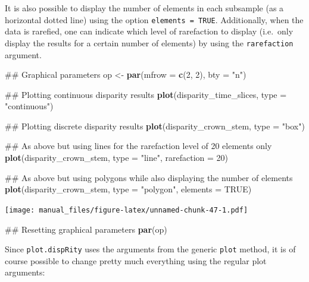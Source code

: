 \documentclass[]{book}
\newenvironment{Shaded}{\begin{snugshade}}{\end{snugshade}}
\newcommand{\KeywordTok}[1]{\textcolor[rgb]{0.13,0.29,0.53}{\textbf{#1}}}
\newcommand{\DataTypeTok}[1]{\textcolor[rgb]{0.13,0.29,0.53}{#1}}
\newcommand{\DecValTok}[1]{\textcolor[rgb]{0.00,0.00,0.81}{#1}}
\newcommand{\StringTok}[1]{\textcolor[rgb]{0.31,0.60,0.02}{#1}}
\newcommand{\OtherTok}[1]{\textcolor[rgb]{0.56,0.35,0.01}{#1}}
\newcommand{\NormalTok}[1]{#1}
\theoremstyle{definition}
\theoremstyle{definition}
\theoremstyle{remark}
\begin{document}
It is also possible to display the number of elements in each subsample
(as a horizontal dotted line) using the option
\texttt{elements\ =\ TRUE}. Additionally, when the data is rarefied, one
can indicate which level of rarefaction to display (i.e.~only display
the results for a certain number of elements) by using the
\texttt{rarefaction} argument.

\begin{Shaded}
\begin{Highlighting}[]
\NormalTok{## Graphical parameters}
\NormalTok{op <-}\StringTok{ }\KeywordTok{par}\NormalTok{(}\DataTypeTok{mfrow =} \KeywordTok{c}\NormalTok{(}\DecValTok{2}\NormalTok{, }\DecValTok{2}\NormalTok{), }\DataTypeTok{bty =} \StringTok{"n"}\NormalTok{)}

\NormalTok{## Plotting continuous disparity results}
\KeywordTok{plot}\NormalTok{(disparity_time_slices, }\DataTypeTok{type =} \StringTok{"continuous"}\NormalTok{)}

\NormalTok{## Plotting discrete disparity results}
\KeywordTok{plot}\NormalTok{(disparity_crown_stem, }\DataTypeTok{type =} \StringTok{"box"}\NormalTok{)}

\NormalTok{## As above but using lines for the rarefaction level of 20 elements only}
\KeywordTok{plot}\NormalTok{(disparity_crown_stem, }\DataTypeTok{type =} \StringTok{"line"}\NormalTok{, }\DataTypeTok{rarefaction =} \DecValTok{20}\NormalTok{)}

\NormalTok{## As above but using polygons while also displaying the number of elements}
\KeywordTok{plot}\NormalTok{(disparity_crown_stem, }\DataTypeTok{type =} \StringTok{"polygon"}\NormalTok{, }\DataTypeTok{elements =} \OtherTok{TRUE}\NormalTok{)}
\end{Highlighting}
\end{Shaded}

\texttt{[image: manual\_files/figure-latex/unnamed-chunk-47-1.pdf]}

\begin{Shaded}
\begin{Highlighting}[]
\NormalTok{## Resetting graphical parameters}
\KeywordTok{par}\NormalTok{(op)}
\end{Highlighting}
\end{Shaded}

Since \texttt{plot.dispRity} uses the arguments from the generic
\texttt{plot} method, it is of course possible to change pretty much
everything using the regular plot arguments:
\end{document}
